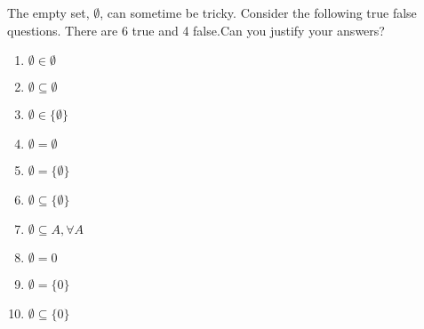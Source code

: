 \begin{problem}
 The empty set, $\emptyset$, can sometime be tricky.  Consider the following true false questions.  There are 6 true and 4 false.Can you justify your answers?


\begin{minipage}{0.3\textwidth}
\begin{enumerate}
\item $\emptyset \in\emptyset$ \hfill \underline{\hspace{3em}}
\item $\emptyset \subseteq \emptyset$\hfill \underline{\hspace{3em}}
\item $\emptyset \in \{\emptyset\}$\hfill \underline{\hspace{3em}}
\item $\emptyset = \emptyset$\hfill \underline{\hspace{3em}}
\item $\emptyset = \{\emptyset\}$\hfill \underline{\hspace{3em}}
\item $\emptyset \subseteq \{ \emptyset\}$\hfill \underline{\hspace{3em}}
\item $\emptyset \subseteq A, \forall A$\hfill \underline{\hspace{3em}}
\item $\emptyset = 0$\hfill \underline{\hspace{3em}}
\item $\emptyset = \{ 0 \}$\hfill \underline{\hspace{3em}}
\item $\emptyset \subseteq \{0\}$\hfill \underline{\hspace{3em}}
\end{enumerate}
\end{minipage}

\vspace{1em}
\end{problem}



